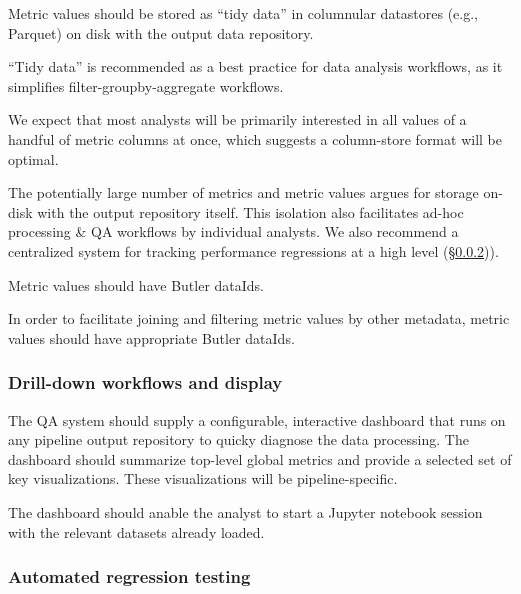 \begin{recommendation}
Metric values should be stored as ``tidy data'' in columnular datastores (e.g., Parquet) on disk with the output data repository.
\end{recommendation}

``Tidy data'' \citep{JSSv059i10} is recommended as a best practice for data analysis workflows, as it simplifies filter-groupby-aggregate workflows.

We expect that most analysts will be primarily interested in all values of a handful of metric columns at once, which suggests a column-store format will be optimal.

The potentially large number of metrics and metric values argues for storage on-disk with the output repository itself.
This isolation also facilitates ad-hoc processing \& QA workflows by individual analysts.
We also recommend a centralized system for tracking performance regressions at a high level (\S \ref{sec:regression})).

\begin{recommendation}
Metric values should have Butler dataIds.
\end{recommendation}

In order to facilitate joining and filtering metric values by other metadata, metric values should have appropriate Butler dataIds.

\subsubsection{Drill-down workflows and display} \label{sec:metric_displays}

\begin{recommendation}
The QA system should supply a configurable, interactive dashboard that runs on any pipeline output repository to quicky diagnose the data processing.
The dashboard should summarize top-level global metrics and provide a selected set of key visualizations.
These visualizations will be pipeline-specific.  
\end{recommendation}

\begin{recommendation}
The dashboard should anable the analyst to start a Jupyter notebook session with the relevant datasets already loaded.
\end{recommendation}


\subsubsection{Automated regression testing} \label{sec:regression}


